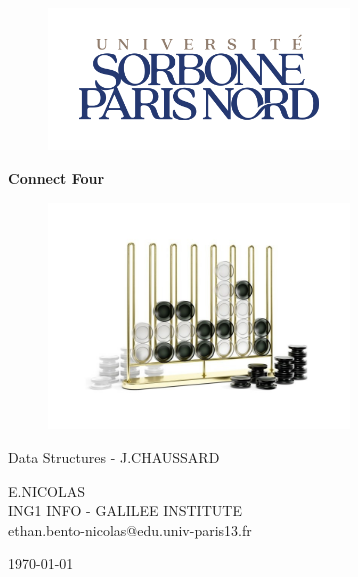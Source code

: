 \documentclass[a4paper,fleqn]{article}
\begin{document}


\pagecolor{color}
\thispagestyle{empty}

\begin{figure}
    \centering
    \includegraphics[width=8cm]{./uspn.png}
\end{figure}

\vspace{6cm}

\begin{center}
    {\huge \bfseries Connect Four \par}
    
    \vspace{1cm}
    
    \begin{figure}[h]
        \centering
        \includegraphics[width=8cm]{./cover.jpeg}
    \end{figure}
    
    \vspace{2cm}
    
    \large Data Structures - J.CHAUSSARD \\
    
    \vspace{1cm}
    
    E.NICOLAS \\
    ING1 INFO - GALILEE INSTITUTE \\
    ethan.bento-nicolas@edu.univ-paris13.fr
    
    \vfill
    
    \today 
    \pagebreak
\end{center}
\end{document}
